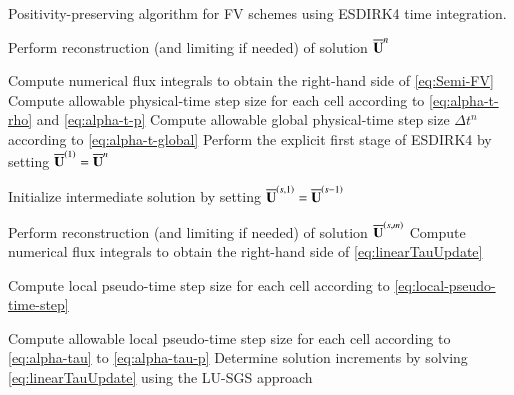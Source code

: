  \begin{algorithm}[htbp!]
        \renewcommand{\baselinestretch}{1.3}\selectfont
 	\caption{Positivity-preserving algorithm for FV schemes using ESDIRK4 time integration.}  
 	\label{alg:pp-algorithm}
 	\begin{algorithmic}[1] 
        
        \State Perform reconstruction (and limiting if needed) of solution $\overline{\mathbf{U}}^{n}$ %
                
        \State Compute numerical flux integrals to obtain the right-hand side of \eqref{eq:Semi-FV} %
        \State Compute allowable physical-time step size for each cell according to \eqref{eq:alpha-t-rho} and \eqref{eq:alpha-t-p}
        \State Compute allowable global physical-time step size $\Delta t^n$ according to \eqref{eq:alpha-t-global}
        \State Perform the explicit first stage of ESDIRK4 by setting $\overline{\mathbf{U}}^{\left(1\right)} =\overline{\mathbf{U}}^{n}$ %

        \State Initialize intermediate solution by setting $\overline{\mathbf{U}}^{\left(s,1\right)}=\overline{\mathbf{U}}^{\left(s-1\right)}$ 
        

        \State Perform reconstruction (and limiting if needed) of solution $\overline{\mathbf{U}}^{\left(s,m\right)}$ %
        \State Compute numerical flux integrals to obtain the right-hand side of \eqref{eq:linearTauUpdate} %
        
        \State Compute local pseudo-time step size for each cell according to \eqref{eq:local-pseudo-time-step}

        \State Compute allowable local pseudo-time step size for each cell according to \eqref{eq:alpha-tau} to \eqref{eq:alpha-tau-p}
        \State Determine solution increments by solving \eqref{eq:linearTauUpdate} using the LU-SGS approach  %


\end{algorithmic}
\end{algorithm}

